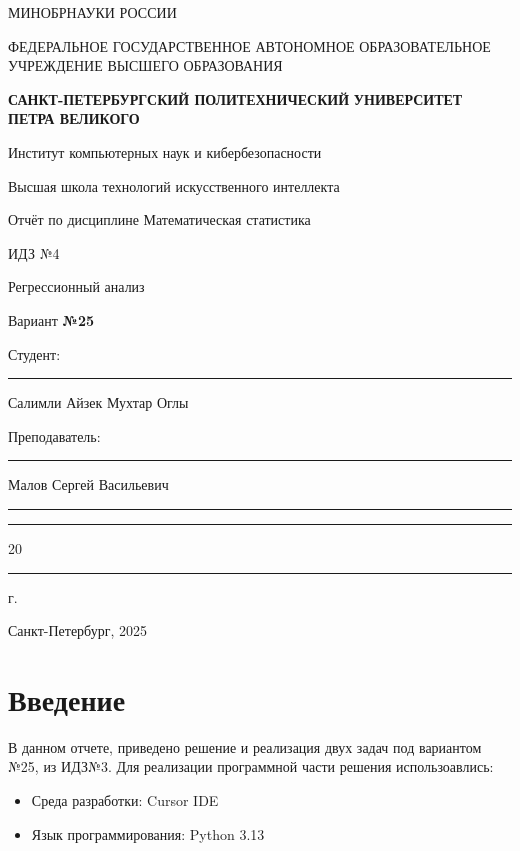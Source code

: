 \documentclass[areasetadvanced]{scrartcl}
\begin{document}
\sloppy
	\thispagestyle{empty}
	\begin{center}
		\large{МИНОБРНАУКИ РОССИИ} \par
		\vspace{0.3cm}
		\normalsize
		{ФЕДЕРАЛЬНОЕ ГОСУДАРСТВЕННОЕ АВТОНОМНОЕ ОБРАЗОВАТЕЛЬНОЕ УЧРЕЖДЕНИЕ ВЫСШЕГО ОБРАЗОВАНИЯ} \par
		\vspace{0.3cm}
		\textbf{\guillemotleft САНКТ-ПЕТЕРБУРГСКИЙ ПОЛИТЕХНИЧЕСКИЙ}
		\textbf{УНИВЕРСИТЕТ ПЕТРА ВЕЛИКОГО\guillemotright} \par
		\vspace{0.3cm}
		{Институт компьютерных наук и кибербезопасности}\par
		{Высшая школа технологий искусственного интеллекта}\par
	\end{center}
	\vfill
	\begin{center}
		{\large Отчёт по дисциплине \guillemotleft Математическая статистика\guillemotright}\par
		{\huge   ИДЗ №4
		
		\guillemotleft Регрессионный анализ\guillemotright}\par
            {\huge Вариант \textbf{№25}}
         
	\end{center}
	\vfill
	\begin{flushleft}
		Студент: \hspace{1.8cm} \rule[0pt]{2.5cm}{0.5pt}\hfill Салимли Айзек Мухтар Оглы\par
		\vspace{1.5cm}
		Преподаватель: \hspace{0.55cm} \rule[0pt]{2.5cm}{0.5pt}\hfill  Малов Сергей Васильевич
	\end{flushleft}
	\vspace{0.5cm}
	\begin{flushright}
		\guillemotleft \rule[0pt]{0.8cm}{0.5pt}\guillemotright \rule[0pt]{2cm}{0.5pt} 20\rule[0pt]{0.5cm}{0.5pt} г.
	\end{flushright}
	\vfill
	\begin{center}
		Санкт-Петербург, 2025
	\end{center}
	\newpage
	\tableofcontents
	\newpage
\section*{Введение}
В данном отчете, приведено решение и реализация двух задач под вариантом №25, из ИДЗ№3. Для реализации программной части решения использоавлись:
\begin{itemize}
    \item Среда разработки: Cursor IDE
    \item Язык программирования: Python 3.13
\end{itemize}
\newpage
\end{document}
